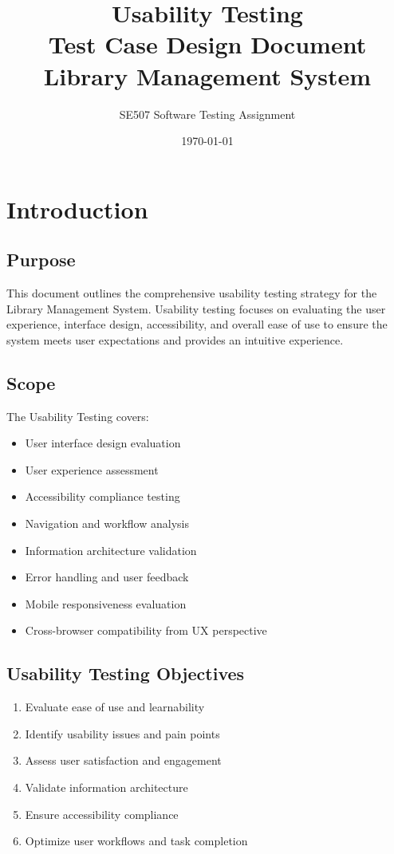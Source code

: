 \documentclass[12pt,a4paper]{article}
\title{\textbf{Usability Testing} \\ \large Test Case Design Document \\ Library Management System}
\author{SE507 Software Testing Assignment}
\date{\today}
\begin{document}
\maketitle

\tableofcontents
\newpage

\section{Introduction}

\subsection{Purpose}
This document outlines the comprehensive usability testing strategy for the Library Management System. Usability testing focuses on evaluating the user experience, interface design, accessibility, and overall ease of use to ensure the system meets user expectations and provides an intuitive experience.

\subsection{Scope}
The Usability Testing covers:
\begin{itemize}
    \item User interface design evaluation
    \item User experience assessment
    \item Accessibility compliance testing
    \item Navigation and workflow analysis
    \item Information architecture validation
    \item Error handling and user feedback
    \item Mobile responsiveness evaluation
    \item Cross-browser compatibility from UX perspective
\end{itemize}

\subsection{Usability Testing Objectives}
\begin{enumerate}
    \item Evaluate ease of use and learnability
    \item Identify usability issues and pain points
    \item Assess user satisfaction and engagement
    \item Validate information architecture
    \item Ensure accessibility compliance
    \item Optimize user workflows and task completion
\end{enumerate}
\end{document}
